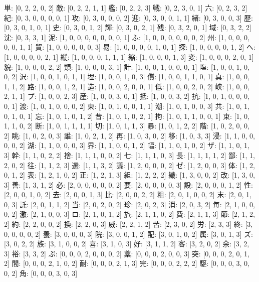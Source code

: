 \documentclass[a4paper,10pt,ngerman]{scrartcl}
\begin{document}
単: [0, 2, 2, 0, 2]
敵: [0, 2, 2, 1, 1]
艦: [0, 2, 2, 3]
戦: [0, 2, 3, 0, 1]
六: [0, 2, 3, 2]
紀: [0, 3, 0, 0, 0, 0, 1]
攻: [0, 3, 0, 0, 0, 2]
迎: [0, 3, 0, 0, 1, 1]
緒: [0, 3, 0, 0, 3]
歴: [0, 3, 0, 1, 0, 1]
史: [0, 3, 0, 1, 2]
輝: [0, 3, 0, 2, 1]
残: [0, 3, 2, 0, 1]
域: [0, 3, 2, 2]
沈: [0, 3, 3, 1]
泥: [1, 0, 0, 0, 0, 0, 0, 0, 1]
ふ: [1, 0, 0, 0, 0, 0, 0, 2]
州: [1, 0, 0, 0, 0, 0, 1, 1]
貿: [1, 0, 0, 0, 0, 0, 3]
易: [1, 0, 0, 0, 0, 1, 0, 1]
探: [1, 0, 0, 0, 0, 1, 2]
へ: [1, 0, 0, 0, 0, 2, 1]
縦: [1, 0, 0, 0, 1, 1, 1]
縮: [1, 0, 0, 0, 1, 3]
変: [1, 0, 0, 0, 2, 0, 1]
貌: [1, 0, 0, 0, 2, 2]
類: [1, 0, 0, 0, 3, 1]
計: [1, 0, 0, 1, 0, 0, 0, 1]
塩: [1, 0, 0, 1, 0, 0, 2]
沢: [1, 0, 0, 1, 0, 1, 1]
埋: [1, 0, 0, 1, 0, 3]
償: [1, 0, 0, 1, 1, 0, 1]
真: [1, 0, 0, 1, 1, 2]
路: [1, 0, 0, 1, 2, 1]
造: [1, 0, 0, 2, 0, 0, 1]
低: [1, 0, 0, 2, 0, 2]
峡: [1, 0, 0, 2, 1, 1]
プ: [1, 0, 0, 2, 3]
産: [1, 0, 0, 3, 0, 1]
抵: [1, 0, 0, 3, 2]
抗: [1, 0, 1, 0, 0, 0, 0, 1]
渡: [1, 0, 1, 0, 0, 0, 2]
東: [1, 0, 1, 0, 0, 1, 1]
潮: [1, 0, 1, 0, 0, 3]
共: [1, 0, 1, 0, 1, 0, 1]
忘: [1, 0, 1, 0, 1, 2]
昔: [1, 0, 1, 0, 2, 1]
拘: [1, 0, 1, 1, 0, 0, 1]
束: [1, 0, 1, 1, 0, 2]
断: [1, 0, 1, 1, 1, 1]
切: [1, 0, 1, 1, 3]
暴: [1, 0, 1, 2, 2]
階: [1, 0, 2, 0, 0, 2]
眺: [1, 0, 2, 0, 3]
誰: [1, 0, 2, 1, 2]
再: [1, 0, 3, 0, 2]
移: [1, 0, 3, 3]
浸: [1, 1, 0, 0, 0, 0, 2]
湖: [1, 1, 0, 0, 0, 3]
界: [1, 1, 0, 0, 1, 2]
幅: [1, 1, 0, 1, 0, 2]
ザ: [1, 1, 0, 1, 3]
幹: [1, 1, 0, 2, 2]
捨: [1, 1, 1, 0, 0, 2]
七: [1, 1, 1, 0, 3]
長: [1, 1, 1, 1, 2]
鄙: [1, 1, 2, 0, 2]
往: [1, 1, 2, 3]
選: [1, 1, 3, 2]
議: [1, 2, 0, 0, 0, 2]
ゼ: [1, 2, 0, 0, 3]
体: [1, 2, 0, 1, 2]
表: [1, 2, 1, 0, 2]
正: [1, 2, 1, 3]
組: [1, 2, 2, 2]
織: [1, 3, 0, 0, 2]
改: [1, 3, 0, 3]
善: [1, 3, 1, 2]
必: [2, 0, 0, 0, 0, 0, 2]
要: [2, 0, 0, 0, 0, 3]
設: [2, 0, 0, 0, 1, 2]
性: [2, 0, 0, 1, 0, 2]
去: [2, 0, 0, 1, 3]
比: [2, 0, 0, 2, 2]
粗: [2, 0, 1, 0, 0, 2]
末: [2, 0, 1, 0, 3]
託: [2, 0, 1, 1, 2]
当: [2, 0, 2, 0, 2]
珍: [2, 0, 2, 3]
消: [2, 0, 3, 2]
毎: [2, 1, 0, 0, 0, 2]
激: [2, 1, 0, 0, 3]
ロ: [2, 1, 0, 1, 2]
旅: [2, 1, 1, 0, 2]
費: [2, 1, 1, 3]
節: [2, 1, 2, 2]
約: [2, 2, 0, 0, 2]
換: [2, 2, 0, 3]
威: [2, 2, 1, 2]
苦: [2, 3, 0, 2]
労: [2, 3, 3]
終: [3, 0, 0, 0, 0, 2]
養: [3, 0, 0, 0, 3]
院: [3, 0, 0, 1, 2]
配: [3, 0, 1, 0, 2]
属: [3, 0, 1, 3]
ズ: [3, 0, 2, 2]
族: [3, 1, 0, 0, 2]
喜: [3, 1, 0, 3]
好: [3, 1, 1, 2]
客: [3, 2, 0, 2]
余: [3, 2, 3]
裕: [3, 3, 2]
ぷ: [0, 0, 0, 2, 0, 0, 0, 2]
藁: [0, 0, 0, 2, 0, 0, 3]
突: [0, 0, 0, 2, 0, 1, 2]
間: [0, 0, 0, 2, 1, 0, 2]
耐: [0, 0, 0, 2, 1, 3]
完: [0, 0, 0, 2, 2, 2]
駆: [0, 0, 0, 3, 0, 0, 2]
角: [0, 0, 0, 3, 0, 3]
\end{document}
